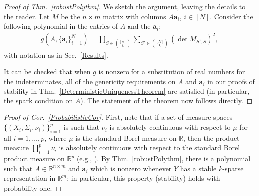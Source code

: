 \documentclass[journal, twocolumn]{IEEEtran}
\newtheorem{lemma}{Lemma}
\begin{document}
\begin{proof}[Proof of Thm.~\ref{robustPolythm}]
We sketch the argument, leaving the details to the reader.
Let $M$ be the $n \times m$ matrix with columns $A\mathbf{a}_i$, $i \in [N]$.  Consider the following polynomial \cite[Sec.~IV]{Hillar15} in the entries of $A$ and the $\mathbf{a}_i$:
\begin{align*}
g(A, \{\mathbf{a}_i\}_{i=1}^N) = \prod_{S \in {[n] \choose k}} \sum_{S' \in {[N] \choose k}} (\det M_{S',S})^2,
\end{align*}
with notation as in Sec.~\ref{Results}.  

It can be checked that when $g$ is nonzero for a substitution of real numbers for the indeterminates, all of the genericity requirements on $A$ and $\mathbf{a}_i$ in our proofs of stability in Thm.~\ref{DeterministicUniquenessTheorem} are satisfied (in particular, the spark condition on $A$). The statement of the theorem now follows directly.
\end{proof}

 \begin{proof}[Proof of Cor.~\ref{ProbabilisticCor}]
First, note that if a set of measure spaces $\{(X_i, \Sigma_i, \nu_i)\}_{i=1}^p$ is such that $\nu_i$ is absolutely continuous with respect to $\mu$ for all $i = 1, \ldots, p$, where $\mu$ is the standard Borel measure on $\mathbb{R}$, then the product measure $\prod_{i=1}^p \nu_i$ is absolutely continuous with respect to the standard Borel product measure on $\mathbb{R}^p$ (e.g.,  \cite{folland2013real}). By Thm.~\ref{robustPolythm}, there is a polynomial such that $A \in \mathbb{R}^{n \times m}$ and $\mathbf{a}_i$ which is nonzero whenever $Y$ has a stable $k$-sparse representation in $\mathbb R^m$; in particular, this property (stability) holds with probability one.
\end{proof}
\end{document}
